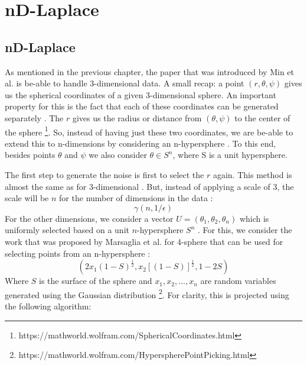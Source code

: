 \chapter{nD-Laplace}



\newpage
\section{nD-Laplace}
As mentioned in the previous chapter, the paper that was introduced by Min et al. is be-able to handle 3-dimensional data.
A small recap: a point $(r, \theta, \psi)$ gives us the spherical coordinates of a given 3-dimensional sphere.
An important property for this is the fact that each of these coordinates can be generated separately \citep{DBLP:journals/corr/abs-1212-1984, 9646489}.
The $r$ gives us the radius or distance from $(\theta, \psi)$ to the center of the sphere \footnote{https://mathworld.wolfram.com/SphericalCoordinates.html}.
So, instead of having just these two coordinates, we are be-able to extend this to n-dimensions by considering an n-hypersphere \citep{fernandes_generalised_2019, 9646489}.
To this end, besides points $\theta$ and $\psi$ we also consider $\theta \in S^n$, where S is a unit hypersphere.

The first step to generate the noise is first to select the $r$ again.
This method is almost the same as for 3-dimensional .
But, instead of applying a scale of 3, the scale will be $n$ for the number of dimensions in the data \citep{fernandes_generalised_2019}:
\begin{equation}
  \gamma(n, 1/\epsilon)
\end{equation}
For the other dimensions, we consider a vector $U = (\theta_1, \theta_2, \theta_n)$ which is uniformly selected based on a unit $n$-hypersphere $S^n$ \citep{fernandes_generalised_2019}.
For this, we consider the work that was proposed by Marsaglia et al. for 4-sphere that can be used for selecting points from an n-hypersphere \citep{marsaglia_choosing_1972}:
\begin{equation}
  (2x_1 (1 - S)^{\frac{1}{2}}, x_2[(1 - S)]^{\frac{1}{2}}, 1 - 2S)
\end{equation}
Where $S$ is the surface of the sphere and $x_1, x_2, …, x_n$ are random variables generated using the Gaussian distribution \footnote{https://mathworld.wolfram.com/HyperspherePointPicking.html}.
For clarity, this is projected using the following algorithm:
